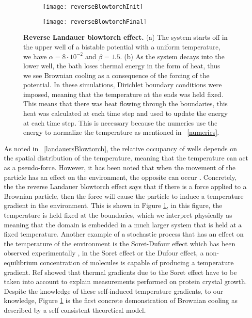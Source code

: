 \begin{figure}
	\begin{subfigure}{0.49\textwidth}
		\texttt{[image: reverseBlowtorchInit]}
	\end{subfigure}
	\begin{subfigure}{0.49\textwidth}
		\texttt{[image: reverseBlowtorchFinal]}
	\end{subfigure}
	\caption{\textbf{Reverse Landauer blowtorch effect.} (a) The system starts off in the upper well of a bistable potential with a uniform temperature, we have $\alpha = 8 \cdot 10^{-2}$ and $\beta = 1.5$. (b) As the system decays into the lower well, the bath loses thermal energy in the form of heat, thus we see Brownian cooling as a consequence of the forcing of the potential. In these simulations, Dirichlet boundary conditions were imposed, meaning that the temperature at the ends was held fixed. This means that there was heat flowing through the boundaries, this heat was calculated at each time step and used to update the energy at each time step. This is necessary because the numerics use the energy to normalize the temperature as mentioned in ~\autoref{numerics}. \label{fig:reverseBlowtorch}}
\end{figure}
As noted in ~\autoref{landauersBlowtorch}, the relative occupancy of wells depends on the spatial distribution of the temperature, meaning that the temperature can act as a pseudo-force. However, it has been noted that when the movement of the particle has an effect on the environment, the opposite can occur \cite{DasDasBarikEtAl2015}. Concretely, the the reverse Landauer blowtorch effect says that if there is a force applied to a Brownian particle, then the force will cause the particle to induce a temperature gradient in the environment. This is shown in Figure \ref{fig:reverseBlowtorch}, in this figure, the temperature is held fixed at the boundaries, which we interpret physically as meaning that the domain is embedded in a much larger system that is held at a fixed temperature. Another example of a stochastic process that has an effect on the temperature of the environment is the Soret-Dufour effect which has been observed experimentally \cite{Onsager1931,HortLinzLuecke1992,PiazzaGuarino2002}, in the Soret effect or the Dufour effect, a non-equilibrium concentration of molecules is capable of producing a temperature gradient. Ref \cite{Santamaria-HolekGadomskiRubi2011} showed that thermal gradients due to the Soret effect have to be taken into account to explain measurements performed on protein crystal growth. Despite the knowledge of these self-induced temperature gradients, to our knowledge, Figure \ref{fig:reverseBlowtorch} is the first concrete demonstration of Brownian cooling as described by a self consistent theoretical model.

